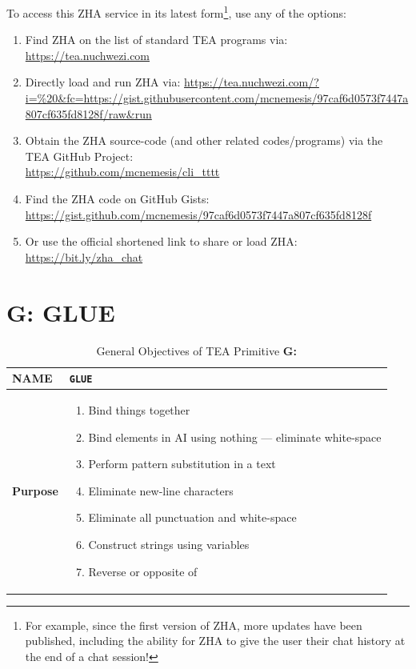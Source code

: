 \documentclass[a4paper, 18pt]{book} %
\begin{document}
\vspace{2em}

To access this ZHA service in its latest form\footnote{For example, since the first version of ZHA, more updates have been published, including the ability for ZHA to give the user their chat history at the end of a chat session!}, use any of the options:

\vspace{2em}

\begin{enumerate}
\item Find ZHA on the list of standard TEA programs via:\\ \url{https://tea.nuchwezi.com}
\item Directly load and run ZHA via: {\normalsize \url{https://tea.nuchwezi.com/?i=\%20&fc=https://gist.githubusercontent.com/mcnemesis/97caf6d0573f7447a807cf635fd8128f/raw&run} }
\item{Obtain the ZHA source-code (and other related codes/programs) via the TEA GitHub Project:\\
\url{https://github.com/mcnemesis/cli_tttt}}
\item{ Find the ZHA code on GitHub Gists:\\
\url{https://gist.github.com/mcnemesis/97caf6d0573f7447a807cf635fd8128f}}
\item{ Or use the official shortened link to share or load ZHA:\\
 \url{https://bit.ly/zha_chat}
 }
\end{enumerate}



\chapter{G: GLUE}
\label{CHAPG}


\begin{table}[H]
  \centering
  \LARGE
	\begin{tabular}[t]{|p{}|p{}}
 
	\textbf{NAME} & \texttt{GLUE}\\
	\hline
	\textbf{Purpose} & \begin{enumerate}
	\item Bind things together
	\item Bind elements in AI using nothing --- eliminate white-space
	\item Perform pattern substitution in a text
	\item Eliminate new-line characters
	\item Eliminate all punctuation and white-space
	\item Construct strings using variables
	\item Reverse or opposite of \text{H:}
	\end{enumerate}\\
	\hline
	              
\end{tabular}
\caption{General Objectives of TEA Primitive \textbf{G:}}
  \label{TABTAZG}
\end{table}
\end{document}
